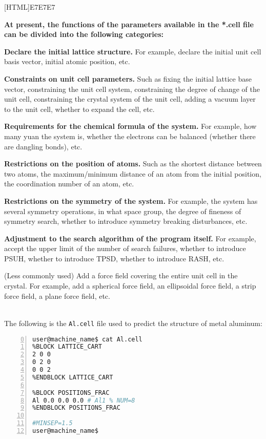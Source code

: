 \documentclass[a4paper, 10pt]{article}
\begin{document}
\noindent{}[HTML]{E7E7E7}{\parbox{\textwidth}{%
\noindent \textbf{At present, the functions of the parameters available in the *.cell file can be divided into the following categories:}
\begin{maineu}
  \item \textbf{Declare the initial lattice structure.} For example, declare the initial unit cell basis vector, initial atomic position, etc.
  \item \textbf{Constraints on unit cell parameters.} Such as fixing the initial lattice base vector, constraining the unit cell system, constraining the degree of change of the unit cell, constraining the crystal system of the unit cell, adding a vacuum layer to the unit cell, whether to expand the cell, etc.
  \item \textbf{Requirements for the chemical formula of the system.} For example, how many yuan the system is, whether the electrons can be balanced (whether there are dangling bonds), etc.
  \item\textbf{Restrictions on the position of atoms.} Such as the shortest distance between two atoms, the maximum/minimum distance of an atom from the initial position, the coordination number of an atom, etc.
  \item \textbf{Restrictions on the symmetry of the system.} For example, the system has several symmetry operations, in what space group, the degree of fineness of symmetry search, whether to introduce symmetry breaking disturbances, etc.
  \item \textbf{Adjustment to the search algorithm of the program itself.} For example, accept the upper limit of the number of search failures, whether to introduce PSUH, whether to introduce TPSD, whether to introduce RASH, etc.
  \item (Less commonly used) Add a force field covering the entire unit cell in the crystal. For example, add a spherical force field, an ellipsoidal force field, a strip force field, a plane force field, etc.
\end{maineu}}}\\

The following is the \verb|Al.cell| file used to predict the structure of metal aluminum:
\begin{lstlisting}[language={bash},numbers=left,firstnumber=0]
user@machine_name$ cat Al.cell
%BLOCK LATTICE_CART
2 0 0
0 2 0
0 0 2 
%ENDBLOCK LATTICE_CART

%BLOCK POSITIONS_FRAC
Al 0.0 0.0 0.0 # Al1 % NUM=8
%ENDBLOCK POSITIONS_FRAC

#MINSEP=1.5
user@machine_name$
\end{lstlisting}
\end{document}
